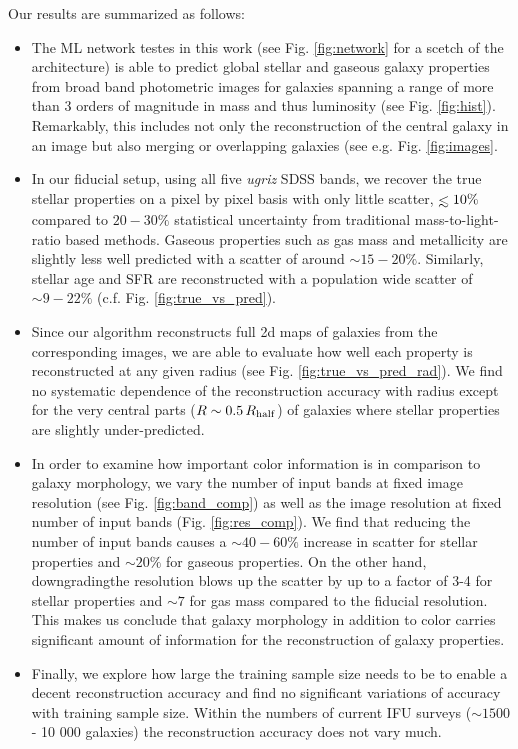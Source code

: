 \documentclass[useAMS,usenatbib]{mnras}
\def\lesssim{\mathrel{\hbox{\rlap{\hbox{\lower4pt\hbox{$\sim$}}}\hbox{$<$}}}}
\begin{document}
Our results are summarized as follows:
\begin{itemize}
\item The ML network testes in this work (see Fig. \ref{fig:network} for a scetch of the architecture) is able to predict global stellar and gaseous galaxy properties from broad band photometric images for galaxies spanning a range of more than 3 orders of magnitude in mass and thus luminosity (see Fig. \ref{fig:hist}). Remarkably, this includes not only the reconstruction of the central galaxy in an image but also merging or overlapping galaxies (see e.g. Fig. \ref{fig:images}.  
\item In our fiducial setup, using all five \emph{ugriz} SDSS bands, we recover the true stellar properties on a pixel by pixel basis with only little scatter, $\lesssim10\%$ compared to $20-30\%$ statistical uncertainty from traditional mass-to-light-ratio based methods. Gaseous properties such as gas mass and metallicity are slightly less well predicted with a scatter of around $\sim15-20\%$. Similarly, stellar age and SFR are reconstructed with a population wide scatter of $\sim9-22\%$ (c.f. Fig. \ref{fig:true_vs_pred}).
\item Since our algorithm reconstructs full 2d maps of galaxies from the corresponding images, we are able to evaluate how well each property is reconstructed at any given radius (see Fig. \ref{fig:true_vs_pred_rad}). We find no systematic dependence of the reconstruction accuracy with radius except for the very central parts ($R\sim0.5\,R_{\rm half}$) of galaxies where stellar properties are slightly under-predicted.   
\item In order to examine how important color information is in comparison to galaxy morphology, we vary the number of input bands at fixed image resolution (see Fig. \ref{fig:band_comp}) as well as the image resolution at fixed number of input bands (Fig. \ref{fig:res_comp}). We find that reducing the number of input bands causes a $\sim40-60\%$ increase in scatter for stellar properties and $\sim20\%$ for gaseous properties. On the other hand, downgradingthe resolution blows up the scatter by up to a factor of 3-4 for stellar properties and $\sim7$ for gas mass compared to the fiducial resolution. This makes us conclude that galaxy morphology in addition to color carries significant amount of information for the reconstruction of galaxy properties.
\item Finally, we explore how large the training sample size needs to be to enable a decent reconstruction accuracy and find no significant variations of accuracy with training sample size. Within the numbers of current IFU surveys ($\sim1500$ - 10 000 galaxies) the reconstruction accuracy does not vary much.  
\end{itemize} 
\end{document}
